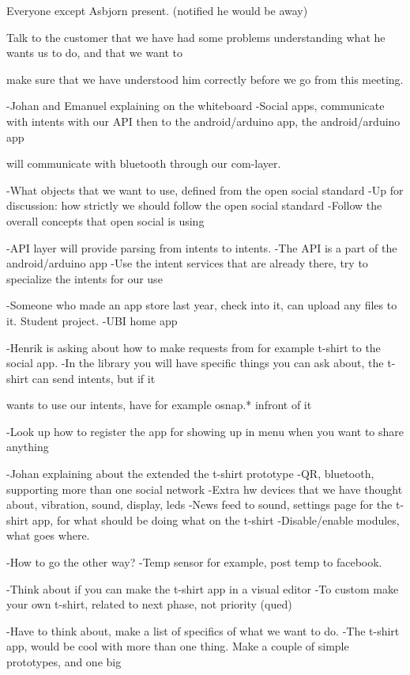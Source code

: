 Everyone except Asbjorn present. (notified he would be away)

Talk to the customer that we have had some problems understanding what he wants us to do, and that we want to 

make sure that we have understood him correctly before we go from this meeting.

-Johan and Emanuel explaining on the whiteboard
 -Social apps, communicate with intents with our API then to the android/arduino app, the android/arduino app 

  will communicate with bluetooth through our com-layer.
 
 -What objects that we want to use, defined from the open social standard
  -Up for discussion: how strictly we should follow the open social standard
   -Follow the overall concepts that open social is using


 -API layer will provide parsing from intents to intents.
  -The API is a part of the android/arduino app
  -Use the intent services that are already there, try to specialize the intents for our use


 -Someone who made an app store last year, check into it, can upload any files to it. Student project.
  -UBI home app
 
 -Henrik is asking about how to make requests from for example t-shirt to the social app. 
  -In the library you will have specific things you can ask about, the t-shirt can send intents, but if it    


wants to use our intents, have for example osnap.* infront of it


 -Look up how to register the app for showing up in menu when you want to share anything

-Johan explaining about the extended the t-shirt prototype
 -QR, bluetooth, supporting more than one social network
 -Extra hw devices that we have thought about, vibration, sound, display, leds
 -News feed to sound, settings page for the t-shirt app, for what should be doing what on the t-shirt
  -Disable/enable modules, what goes where.
 
 -How to go the other way?
  -Temp sensor for example, post temp to facebook.
  
 -Think about if you can make the t-shirt app in a visual editor
  -To custom make your own t-shirt, related to next phase, not priority (qued)


 -Have to think about, make a list of specifics of what we want to do.
  -The t-shirt app, would be cool with more than one thing. Make a couple of simple prototypes, and one big   


